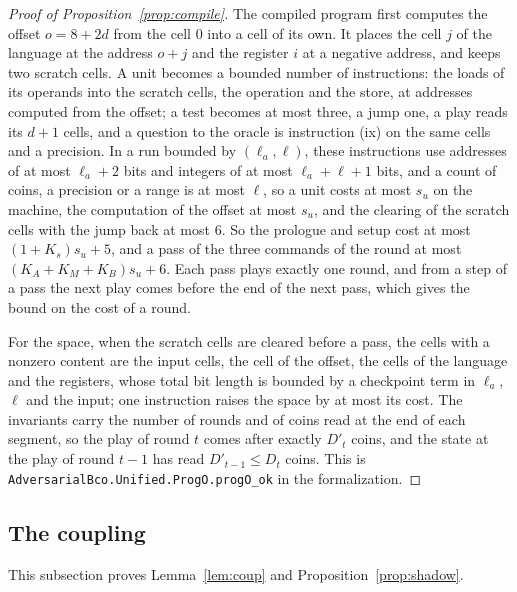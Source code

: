 \documentclass[11pt]{amsart}
\theoremstyle{definition}
\numberwithin{equation}{section}
\begin{document}
\begin{proof}[Proof of Proposition~\ref{prop:compile}]
The compiled program first computes the offset $o=8+2d$ from the cell $0$ into a cell of its own. It places the cell $j$ of the language at the address $o+j$ and the register $i$ at a negative address, and keeps two scratch cells. A unit becomes a bounded number of instructions: the loads of its operands into the scratch cells, the operation and the store, at addresses computed from the offset; a test becomes at most three, a jump one, a play reads its $d+1$ cells, and a question to the oracle is instruction (ix) on the same cells and a precision. In a run bounded by $(\ell_a,\ell)$, these instructions use addresses of at most $\ell_a+2$ bits and integers of at most $\ell_a+\ell+1$ bits, and a count of coins, a precision or a range is at most $\ell$, so a unit costs at most $s_u$ on the machine, the computation of the offset at most $s_u$, and the clearing of the scratch cells with the jump back at most $6$. So the prologue and setup cost at most $(1+K_s)s_u+5$, and a pass of the three commands of the round at most $(K_A+K_M+K_B)s_u+6$. Each pass plays exactly one round, and from a step of a pass the next play comes before the end of the next pass, which gives the bound on the cost of a round.

For the space, when the scratch cells are cleared before a pass, the cells with a nonzero content are the input cells, the cell of the offset, the cells of the language and the registers, whose total bit length is bounded by a checkpoint term in $\ell_a$, $\ell$ and the input; one instruction raises the space by at most its cost. The invariants carry the number of rounds and of coins read at the end of each segment, so the play of round $t$ comes after exactly $D'_t$ coins, and the state at the play of round $t-1$ has read $D'_{t-1}\le D_t$ coins.
This is \texttt{AdversarialBco.Unified.ProgO.progO\_ok} in the formalization.
\end{proof}

\subsection{The coupling}

This subsection proves Lemma~\ref{lem:coup} and Proposition~\ref{prop:shadow}.
\end{document}
